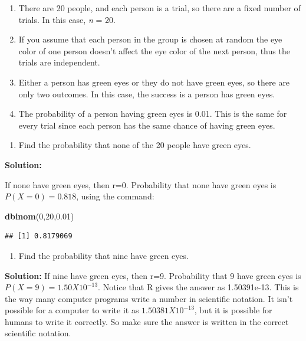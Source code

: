 \documentclass[
]{book}
\newenvironment{Shaded}{\begin{snugshade}}{\end{snugshade}}
\newcommand{\DecValTok}[1]{\textcolor[rgb]{0.00,0.00,0.81}{#1}}
\newcommand{\FloatTok}[1]{\textcolor[rgb]{0.00,0.00,0.81}{#1}}
\newcommand{\KeywordTok}[1]{\textcolor[rgb]{0.13,0.29,0.53}{\textbf{#1}}}
\newcommand{\NormalTok}[1]{#1}
\providecommand{\tightlist}{%
  \setlength{\itemsep}{0pt}\setlength{\parskip}{0pt}}
\begin{document}
\begin{enumerate}
\def\labelenumi{\arabic{enumi}.}
\item
  There are 20 people, and each person is a trial, so there are a fixed number of trials. In this case, \emph{n} = 20.
\item
  If you assume that each person in the group is chosen at random the eye color of one person doesn't affect the eye color of the next person, thus the trials are independent.
\item
  Either a person has green eyes or they do not have green eyes, so there are only two outcomes. In this case, the success is a person has green eyes.
\item
  The probability of a person having green eyes is 0.01. This is the same for every trial since each person has the same chance of having green eyes.
\end{enumerate}

\begin{enumerate}
\def\labelenumi{\alph{enumi}.}
\setcounter{enumi}{2}
\tightlist
\item
  Find the probability that none of the 20 people have green eyes.
\end{enumerate}

\textbf{Solution:}

If none have green eyes, then r=0. Probability that none have green eyes is \(P(X=0)=0.818\), using the command:

\begin{Shaded}
\begin{Highlighting}[]
\KeywordTok{dbinom}\NormalTok{(}\DecValTok{0}\NormalTok{,}\DecValTok{20}\NormalTok{,}\FloatTok{0.01}\NormalTok{)}
\end{Highlighting}
\end{Shaded}

\begin{verbatim}
## [1] 0.8179069
\end{verbatim}

\begin{enumerate}
\def\labelenumi{\alph{enumi}.}
\setcounter{enumi}{3}
\tightlist
\item
  Find the probability that nine have green eyes.
\end{enumerate}

\textbf{Solution:}
If nine have green eyes, then r=9. Probability that 9 have green eyes is \(P(X=9)=1.50X10^{-13}\). Notice that R gives the answer as 1.50391e-13. This is the way many computer programs write a number in scientific notation. It isn't possible for a computer to write it as \(1.50381X10^{-13}\), but it is possible for humans to write it correctly. So make sure the answer is written in the correct scientific notation.
\end{document}

